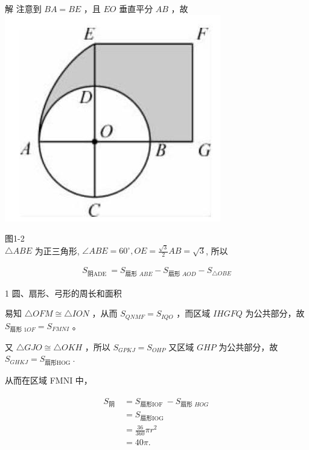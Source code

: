 \documentclass[10pt]{article}
\begin{document}
解 注意到 $B A=B E$ ，且 $E O$ 垂直平分 $A B$ ，故\\
\includegraphics[max width=\textwidth, center]{2024_10_30_66b8e5e701da2093c133g-011}

图1-2\\
$\triangle A B E$ 为正三角形, $\angle A B E=60^{\circ}, O E=\frac{\sqrt{3}}{2} A B=\sqrt{3}$, 所以

\begin{align*}
S_{\text {阴ADE }}=S_{\text {扇形 } A B E}-S_{\text {扇形 } A O D}-S_{\triangle O B E}
\end{align*}

1 圆、扇形、弓形的周长和面积

易知 $\triangle O F M \cong \triangle I O N$ ，从而 $S_{Q N M F}=S_{I Q O}$ ，而区域 $I H G F Q$ 为公共部分，故 $S_{\text {扇形 } 1 O F}=S_{F M N I}$ 。

又 $\triangle G J O \cong \triangle O K H$ ，所以 $S_{G P K J}=S_{O H P}$ 又区域 $G H P$ 为公共部分，故 $S_{G H K J}=S_{\text {扇形HOG }}$.

从而在区域 FMNI 中，

\begin{align*}
\begin{aligned}
S_{\text {阴 }} & =S_{\text {扇形IOF }}-S_{\text {扇形 } H O G ~} \\
& =S_{\text {扇形IOG }} \\
& =\frac{36}{360} \pi r^{2} \\
& =40 \pi .
\end{aligned}
\end{align*}
\end{document}

